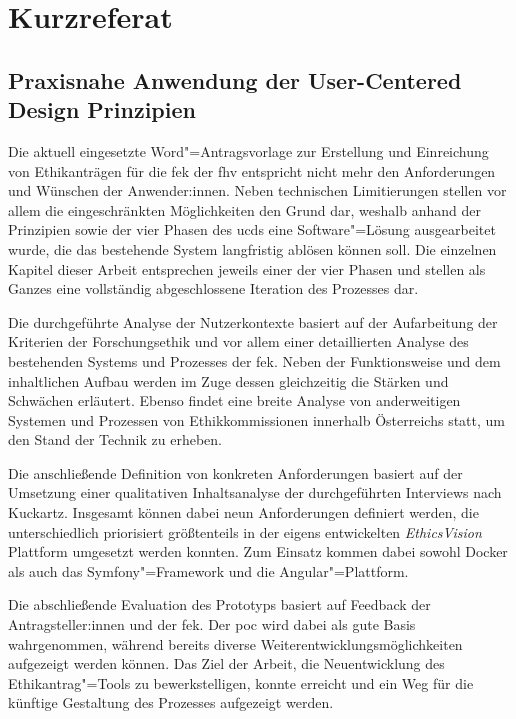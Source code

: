 \documentclass[a4paper,12pt,twoside,numbers=noendperiod]{scrreprt}
\begin{document}
\cleardoublepage
{}
\section*{Kurzreferat}
\label{sec:abstract-de}

\subsection*{Praxisnahe Anwendung der User-Centered Design Prinzipien}

Die aktuell eingesetzte Word"=Antragsvorlage zur Erstellung und Einreichung von Ethikanträgen für die \acl{fek} der \acl{fhv} entspricht nicht mehr den Anforderungen und Wünschen der Anwender:innen. Neben technischen Limitierungen stellen vor allem die eingeschränkten Möglichkeiten den Grund dar, weshalb anhand der Prinzipien sowie der vier Phasen des \acl{ucd}s eine Software"=Lösung ausgearbeitet wurde, die das bestehende System langfristig ablösen können soll. Die einzelnen Kapitel dieser Arbeit entsprechen jeweils einer der vier Phasen und stellen als Ganzes eine vollständig abgeschlossene Iteration des Prozesses dar.

\smallskip

Die durchgeführte Analyse der Nutzerkontexte basiert auf der Aufarbeitung der Kriterien der Forschungsethik und vor allem einer detaillierten Analyse des bestehenden Systems und Prozesses der \acl{fek}. Neben der Funktionsweise und dem inhaltlichen Aufbau werden im Zuge dessen gleichzeitig die Stärken und Schwächen erläutert. Ebenso findet eine breite Analyse von anderweitigen Systemen und Prozessen von Ethikkommissionen innerhalb Österreichs statt, um den Stand der Technik zu erheben.

\smallskip

Die anschließende Definition von konkreten Anforderungen basiert auf der Umsetzung einer qualitativen Inhaltsanalyse der durchgeführten Interviews nach Kuckartz. Insgesamt können dabei neun Anforderungen definiert werden, die unterschiedlich priorisiert größtenteils in der eigens entwickelten \textit{EthicsVision} Plattform umgesetzt werden konnten. Zum Einsatz kommen dabei sowohl Docker als auch das Symfony"=Framework und die Angular"=Plattform.

\smallskip

Die abschließende Evaluation des Prototyps basiert auf Feedback der Antragsteller:innen und der \acl{fek}. Der \acl{poc} wird dabei als gute Basis wahrgenommen, während bereits diverse Weiterentwicklungsmöglichkeiten aufgezeigt werden können. Das Ziel der Arbeit, die Neuentwicklung des Ethikantrag"=Tools zu bewerkstelligen, konnte erreicht und ein Weg für die künftige Gestaltung des Prozesses aufgezeigt werden.
\end{document}
